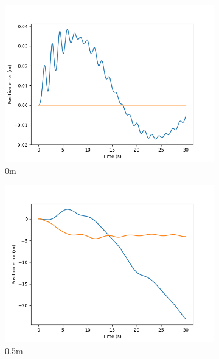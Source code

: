 \documentclass[class=article, crop=false]{standalone}
\begin{document}
\begin{figure}
    \centering
    \begin{subfigure}[b]{0.48\textwidth}
        \centering
        \includegraphics{scenario1/rov-100m/0.0m/rov_position_error_uncontrolled}
        \caption{0m}
        \label{}
    \end{subfigure}
    \hfill
    \begin{subfigure}[b]{0.48\textwidth}
        \centering
        \includegraphics{scenario1/rov-100m/0.5m/rov_position_error_uncontrolled}
        \caption{0.5m}
        \label{}
    \end{subfigure}
    \vfill
    \begin{subfigure}[b]{0.48\textwidth}
        \centering

\end{subfigure}
\end{figure}
\end{document}
